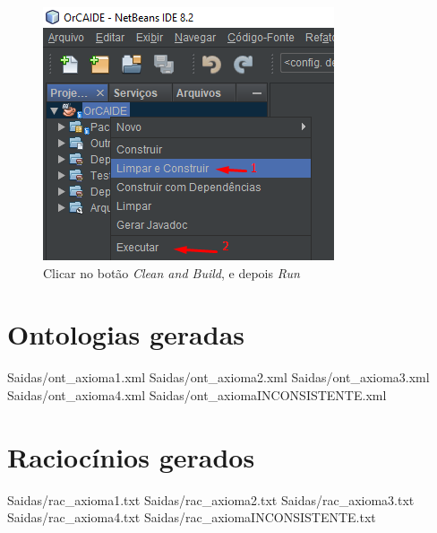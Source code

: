 \documentclass{bcc}
\begin{document}
\begin{figure}[H]
\centering
\includegraphics[width=.6\textwidth]{Figuras/install6.png}
\caption{Clicar no botão \textit{Clean and Build}, e depois \textit{Run}} 
\label{fig:install6}
\end{figure}

\chapter{Ontologias geradas} 
\label{chap:apOntologia}
 {Saidas/ont_axioma1.xml}
 {Saidas/ont_axioma2.xml}
 {Saidas/ont_axioma3.xml}
 {Saidas/ont_axioma4.xml}
 {Saidas/ont_axiomaINCONSISTENTE.xml}

\chapter{Raciocínios gerados}
\label{chap:apRaciocinio}
 {Saidas/rac_axioma1.txt}
 {Saidas/rac_axioma2.txt}
 {Saidas/rac_axioma3.txt}
 {Saidas/rac_axioma4.txt}
 {Saidas/rac_axiomaINCONSISTENTE.txt}
\end{document}
